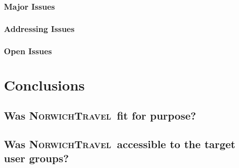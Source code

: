 \documentclass{ueacmpstyle}
\newcommand{\nt}{\textsc{NorwichTravel}}
\begin{document}
			\subsubsection{Major Issues}
			
			\subsubsection{Addressing Issues}
			
			\subsubsection{Open Issues}
	\section{Conclusions}
	
		\subsection{Was \nt \ fit for purpose?}
		
		\subsection{Was \nt \ accessible to the target user groups?}
	
	
	
\end{document}
